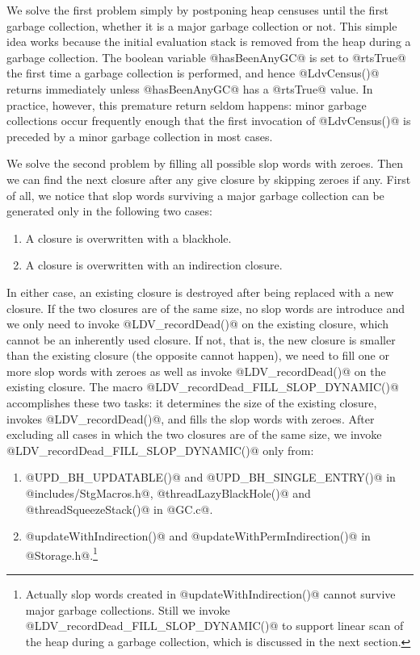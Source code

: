 \documentclass{article}
\begin{document}
We solve the first problem simply by postponing heap censuses until the first
garbage collection, whether it is a major garbage collection or not.
This simple idea works because the initial evaluation stack is removed from
the heap during a garbage collection. The boolean variable @hasBeenAnyGC@
is set to @rtsTrue@ the first time a garbage collection is performed, and
hence @LdvCensus()@ returns immediately unless @hasBeenAnyGC@ has a @rtsTrue@
value. 
In practice, however, this premature return seldom happens: minor garbage 
collections occur frequently enough that the first invocation of @LdvCensus()@ is
preceded by a minor garbage collection in most cases.

We solve the second problem by filling all possible slop words with zeroes.
Then we can find the next closure after any give closure by skipping zeroes
if any. First of all, we notice that slop words surviving a major garbage
collection can be generated only in the following two cases:

\begin{enumerate}
\item A closure is overwritten with a blackhole. 
\item A closure is overwritten with an indirection closure.
\end{enumerate}

In either case, an existing closure is destroyed after being replaced with a 
new closure. 
If the two closures are of the same size, no slop words are introduce and 
we only need to invoke 
@LDV_recordDead()@ on the existing closure, which cannot be an inherently used
closure.
If not, that is, the new closure is smaller than the existing closure 
(the opposite cannot happen), we need to fill one or more slop words with zeroes
as well as invoke @LDV_recordDead()@ on the existing closure.
The macro @LDV_recordDead_FILL_SLOP_DYNAMIC()@ accomplishes these two tasks:
it determines the size of the existing closure, invokes @LDV_recordDead()@, and
fills the slop words with zeroes.
After excluding all cases in which the two closures are of the same size,
we invoke @LDV_recordDead_FILL_SLOP_DYNAMIC()@ only from:

\begin{enumerate}
\item @UPD_BH_UPDATABLE()@ and @UPD_BH_SINGLE_ENTRY()@ in @includes/StgMacros.h@, 
@threadLazyBlackHole()@ and @threadSqueezeStack()@ in @GC.c@.
\item @updateWithIndirection()@ and @updateWithPermIndirection()@ 
in @Storage.h@.\footnote{Actually slop words created in 
@updateWithIndirection()@ cannot survive major garbage collections.
Still we invoke @LDV\_recordDead\_FILL\_SLOP\_DYNAMIC()@ to support linear
scan of the heap during a garbage collection, which is discussed in the next
section.}
\end{enumerate}
\end{document}
